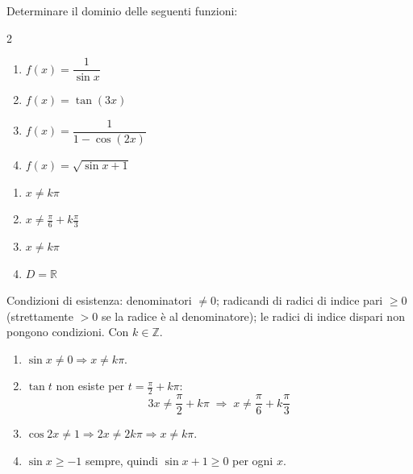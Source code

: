 \begin{question}[ID=2.4, subtitle={Dominio di funzioni trigonometriche}, difficulty=media, tags={dominio,trigonometria}]
Determinare il dominio delle seguenti funzioni:

\begin{center}\begin{minipage}{0.92\linewidth}
\begin{multicols}{2}
\begin{enumerate}[leftmargin=3.2cm]
\item $f(x)=\dfrac{1}{\sin x}$
\item $f(x)=\tan(3x)$
\item $f(x)=\dfrac{1}{1-\cos(2x)}$
\item $f(x)=\sqrt{\sin x + 1}$
\end{enumerate}
\end{multicols}
\end{minipage}\end{center}
\begin{solution}
\begin{enumerate}
    \item $x\neq k\pi$
    \item $x\neq\tfrac\pi6+k\tfrac\pi3$
    \item $x\neq k\pi$
    \item $D=\mathbb{R}$
\end{enumerate}
\end{solution}
\begin{explanation}
Condizioni di esistenza: denominatori $\neq0$; radicandi di radici di indice pari $\geq0$ (strettamente $>0$ se la radice è al denominatore); le radici di indice dispari non pongono condizioni.
Con $k\in\mathbb{Z}$.
\begin{enumerate}
    \item $\sin x\neq0 \Rightarrow x\neq k\pi$.
    \item $\tan t$ non esiste per $t=\tfrac\pi2+k\pi$:
    \[ 3x\neq\dfrac\pi2+k\pi \;\Rightarrow\; x\neq\dfrac\pi6+k\dfrac\pi3 \]
    \item $\cos2x\neq1 \Rightarrow 2x\neq2k\pi \Rightarrow x\neq k\pi$.
    \item $\sin x\geq-1$ sempre, quindi $\sin x+1\geq0$ per ogni $x$.
\end{enumerate}
\end{explanation}
\end{question}

